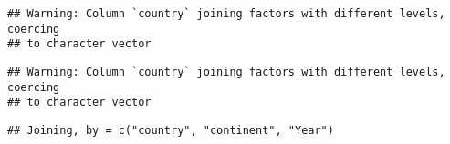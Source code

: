 \documentclass[]{article}
\newenvironment{Shaded}{\begin{snugshade}}{\end{snugshade}}
\newcommand{\DataTypeTok}[1]{\textcolor[rgb]{0.13,0.29,0.53}{#1}}
\newcommand{\KeywordTok}[1]{\textcolor[rgb]{0.13,0.29,0.53}{\textbf{#1}}}
\newcommand{\NormalTok}[1]{#1}
\newcommand{\OperatorTok}[1]{\textcolor[rgb]{0.81,0.36,0.00}{\textbf{#1}}}
\newcommand{\StringTok}[1]{\textcolor[rgb]{0.31,0.60,0.02}{#1}}
\begin{document}
\begin{verbatim}
## Warning: Column `country` joining factors with different levels, coercing
## to character vector
\end{verbatim}

\begin{Shaded}
\end{Shaded}

\begin{verbatim}
## Warning: Column `country` joining factors with different levels, coercing
## to character vector
\end{verbatim}

\begin{Shaded}
\end{Shaded}

\begin{verbatim}
## Joining, by = c("country", "continent", "Year")
\end{verbatim}
\end{document}

